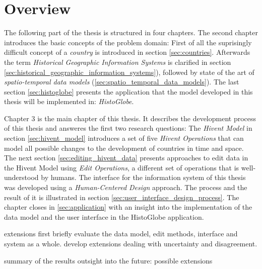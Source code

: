 \section{Overview} %
\label{sec:overview}

The following part of the thesis is structured in four chapters. The second chapter introduces the basic concepts of the problem domain: First of all the suprisingly difficult concept of a \emph{country} is introduced in section \ref{sec:countries}. Afterwards the term \emph{Historical Geographic Information Systems} is clarified in section \ref{sec:historical_geographic_information_systems}), followed by state of the art of \emph{spatio-temporal data models} (\ref{sec:spatio_temporal_data_models}). The last section \ref{sec:histoglobe} presents the application that the model developed in this thesis will be implemented in: \emph{HistoGlobe}.

Chapter 3 is the main chapter of this thesis. It describes the development process of this thesis and answeres the first two research questions: The \emph{Hivent Model} in section \ref{sec:hivent_model} introduces a set of five \emph{Hivent Operations} that can model all possible changes to the development of countries in time and space. The next section \ref{sec:editing_hivent_data} presents approaches to edit data in the Hivent Model using \emph{Edit Operations}, a different set of operations that is well-understood by humans. The interface for the information system of this thesis was developed using a \emph{Human-Centered Design} approach. The process and the result of it is illustrated in section \ref{sec:user_interface_design_process}. The chapter closes in \ref{sec:application} with an insight into the implementation of the data model and the user interface in the HistoGlobe application.

extensions
first briefly evaluate the data model, edit methods, interface and system as a whole.
develop extensions dealing with uncertainty and disagreement.

summary of the results
outsight into the future: possible extensions




